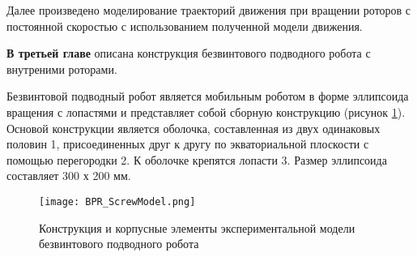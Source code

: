 %

Далее произведено моделирование траекторий движения при вращении роторов с постоянной скоростью с использованием полученной модели движения.





{\textbf{В третьей главе}} описана конструкция безвинтового подводного робота с внутреними роторами. 

Безвинтовой подводный робот является мобильным роботом в форме эллипсоида вращения с лопастями и представляет собой сборную конструкцию (рисунок \ref{constr_BPR}). Основой конструкции является оболочка, составленная из двух одинаковых половин 1, присоединенных друг к другу по экваториальной плоскости с помощью перегородки 2. К оболочке крепятся лопасти 3. Размер эллипсоида составляет 300 х 200 мм. 

\begin{figure}[h]
	\centering
	\texttt{[image: BPR\_ScrewModel.png]}%
	\caption{Конструкция и корпусные элементы экспериментальной модели безвинтового подводного робота}
	\label{constr_BPR}
\end{figure}


